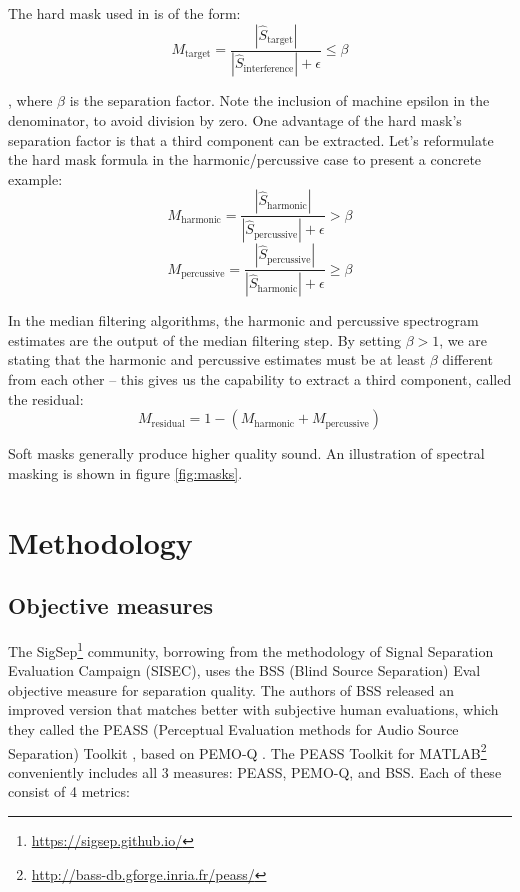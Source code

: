 \documentclass[letter,12pt]{article}
\begin{document}
The hard mask used in \cite{driedger} is of the form:
\[ M_{\text{target}} = \frac{|\hat{S}_{\text{target}}|}{|\hat{S}_{\text{interference}}| + \epsilon} \le \beta \]

, where $\beta$ is the separation factor. Note the inclusion of machine epsilon in the denominator, to avoid division by zero. One advantage of the hard mask's separation factor is that a third component can be extracted. Let's reformulate the hard mask formula in the harmonic/percussive case to present a concrete example:
\[ M_{\text{harmonic}} = \frac{|\hat{S}_{\text{harmonic}}|}{|\hat{S}_{\text{percussive}}| + \epsilon} > \beta \]
\[ M_{\text{percussive}} = \frac{|\hat{S}_{\text{percussive}}|}{|\hat{S}_{\text{harmonic}}| + \epsilon} \ge \beta \]

In the median filtering algorithms, the harmonic and percussive spectrogram estimates are the output of the median filtering step. By setting $\beta > 1$, we are stating that the harmonic and percussive estimates must be at least $\beta$ different from each other -- this gives us the capability to extract a third component, called the residual:
\[ M_{\text{residual}} = 1 - (M_{\text{harmonic}} + M_{\text{percussive}}) \]

Soft masks generally produce higher quality sound. An illustration of spectral masking is shown in figure \ref{fig:masks}.

\section{Methodology}
\label{sec:methodology}

\subsection{Objective measures}

The SigSep\footnote{\url{https://sigsep.github.io/}} community, borrowing from the methodology of Signal Separation Evaluation Campaign (SISEC), uses the BSS (Blind Source Separation) Eval \cite{bss} objective measure for separation quality. The authors of BSS released an improved version that matches better with subjective human evaluations, which they called the PEASS (Perceptual Evaluation methods for Audio Source Separation) Toolkit \cite{peass}, based on PEMO-Q \cite{pemoq}. The PEASS Toolkit for MATLAB\footnote{\url{http://bass-db.gforge.inria.fr/peass/}} conveniently includes all 3 measures: PEASS, PEMO-Q, and BSS. Each of these consist of 4 metrics:
\end{document}
